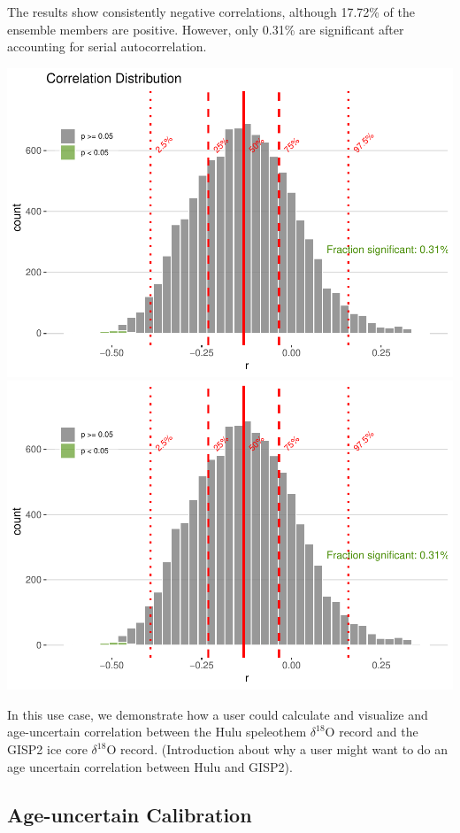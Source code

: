 \documentclass[gc, manuscript]{copernicus}
\begin{document}
The results show consistently negative correlations, although 17.72\% of the ensemble members are positive.
However, only 0.31\% are significant after accounting for serial autocorrelation.

\includegraphics{geoChronR-paper_files/figure-latex/unnamed-chunk-8-1.pdf} \includegraphics{geoChronR-paper_files/figure-latex/unnamed-chunk-8-2.pdf}

In this use case, we demonstrate how a user could calculate and visualize and age-uncertain correlation between the Hulu speleothem \(\delta^{18}\mathrm{O}\) record and the GISP2 ice core \(\delta^{18}\mathrm{O}\) record. (Introduction about why a user might want to do an age uncertain correlation between Hulu and GISP2).

\subsection{Age-uncertain Calibration}
\end{document}
